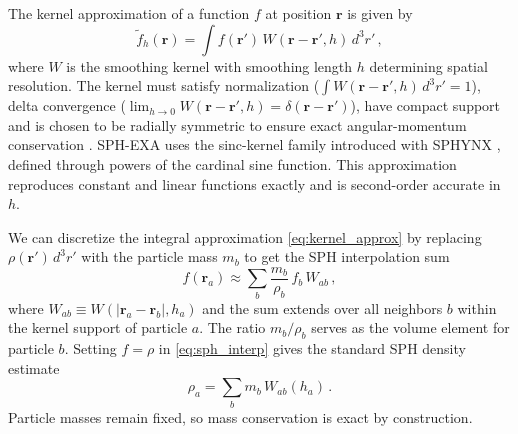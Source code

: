 \label{sec:kernel_approximation}
The kernel approximation of a function $f$ at position $\mathbf{r}$ is given by \cite{Rosswog2009}
\begin{equation}
    \tilde{f}_h(\mathbf{r}) = \int f(\mathbf{r}') \, W(\mathbf{r} - \mathbf{r}', h) \, d^3 r'\,,
    \label{eq:kernel_approx}
\end{equation}
where $W$ is the smoothing kernel with smoothing length $h$ determining spatial resolution. The kernel must satisfy normalization ($\int W(\mathbf{r} - \mathbf{r}', h) \, d^3 r' = 1$), delta convergence ($\lim_{h \to 0} W(\mathbf{r} - \mathbf{r}', h) = \delta(\mathbf{r} - \mathbf{r}')$), have compact support and is chosen to be radially symmetric to ensure exact angular-momentum conservation \cite{Rosswog2009}. SPH-EXA uses the sinc-kernel family introduced with SPHYNX \cite{Cabezon2017}, defined through powers of the cardinal sine function. This approximation reproduces constant and linear functions exactly and is second-order accurate in $h$.


We can discretize the integral approximation \eqref{eq:kernel_approx} by replacing $\rho(\mathbf{r}')\,d^3r'$ with the particle mass $m_b$ to get the SPH interpolation sum \cite{Rosswog2009}
\begin{equation}
    f(\mathbf{r}_a) \approx \sum_b \frac{m_b}{\rho_b}\, f_b \, W_{ab}\,,
    \label{eq:sph_interp}
\end{equation}
where $W_{ab} \equiv W(|\mathbf{r}_a - \mathbf{r}_b|, h_a)$ and the sum extends over all neighbors $b$ within the kernel support of particle $a$. The ratio $m_b/\rho_b$ serves as the volume element for particle $b$. Setting $f = \rho$ in \eqref{eq:sph_interp} gives the standard SPH density estimate
\begin{equation}
    \rho_a = \sum_b m_b \, W_{ab}(h_a)\,.
    \label{eq:density_sum}
\end{equation}
Particle masses remain fixed, so mass conservation is exact by construction.

